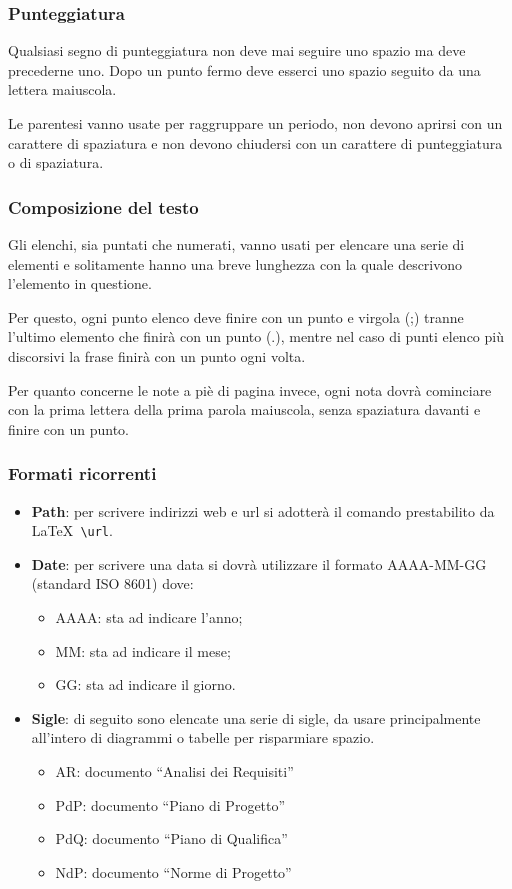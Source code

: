 \subsubsection{Punteggiatura}
Qualsiasi segno di punteggiatura non deve mai seguire uno spazio ma deve precederne uno. Dopo un punto fermo deve esserci uno spazio seguito da una lettera maiuscola.

Le parentesi vanno usate per raggruppare un periodo, non devono aprirsi con un carattere di spaziatura e non devono chiudersi con un carattere di punteggiatura o di spaziatura.

\subsubsection{Composizione del testo}
Gli elenchi, sia puntati che numerati, vanno usati per elencare una serie di elementi e solitamente hanno una breve lunghezza con la quale descrivono l'elemento in questione.

Per questo, ogni punto elenco deve finire con un punto e virgola (;) tranne l'ultimo elemento che finirà con un punto (.), mentre nel caso di punti elenco più discorsivi la frase finirà con un punto ogni volta.

Per quanto concerne le note a piè di pagina invece, ogni nota dovrà cominciare con la prima lettera della prima parola maiuscola, senza spaziatura davanti e finire con un punto.

\subsubsection{Formati ricorrenti}
\label{sec:formati_ricorrenti} 
\begin{itemize}
\item \textbf{Path}: per scrivere indirizzi web e url si adotterà il comando prestabilito da \LaTeX \verb+ \url+.
\item \textbf{Date}: per scrivere una data si dovrà utilizzare il formato AAAA-MM-GG (standard ISO 8601) dove:
\begin{itemize}
\item AAAA: sta ad indicare l'anno;
\item MM: sta ad indicare il mese;
\item GG: sta ad indicare il giorno.
\end{itemize}
\item \textbf{Sigle}: di seguito sono elencate una serie di sigle, da usare principalmente all'intero di diagrammi o tabelle per risparmiare spazio.
\begin{itemize}
\item AR: documento ``Analisi dei Requisiti''
\item PdP: documento ``Piano di Progetto''
\item PdQ: documento ``Piano di Qualifica''
\item NdP: documento ``Norme di Progetto''
\end{itemize}
\end{itemize}

